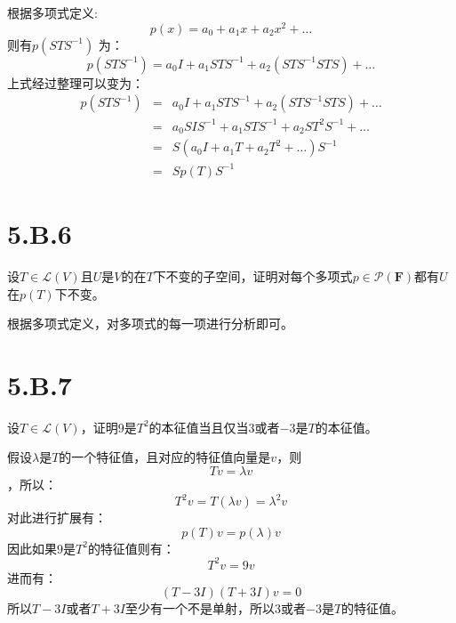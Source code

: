 \documentclass[10pt,a4paper,UTF8]{article}
\begin{document}
\begin{answer}
根据多项式定义:
\begin{equation}
\label{eq:3}
p(x) = a_{0} + a_{1}x + a_{2}x^{2} + \ldots
\end{equation}
则有\(p(STS^{-1})\) 为：
\begin{equation}
\label{eq:4}
p(STS^{-1}) = a_{0}I + a_{1}STS^{-1} + a_{2}(STS^{-1}STS) + \ldots
\end{equation}
上式经过整理可以变为：
\begin{eqnarray}
\label{eq:5}
p(STS^{-1}) &=& a_{0}I + a_{1}STS^{-1} + a_{2}(STS^{-1}STS) + \ldots \\
&=& a_{0}SIS^{-1} + a_{1}STS^{-1} + a_{2}ST^{2}S^{-1} + \ldots \\
&=& S(a_{0}I + a_{1}T + a_{2}T^{2} + \ldots )S^{-1} \\
&=&Sp(T)S^{-1}
\end{eqnarray}
\end{answer}

\section{5.B.6}
\label{sec:org1243dcd}


\begin{problem}
设\(T\in \mathcal{L}(V)\)且\(U\)是\(V\)的在\(T\)下不变的子空间，证明对每个多项式\(p\in \mathcal{P}(\mathbf{F})\)都有\(U\)在\(p(T)\)下不变。
\end{problem}

\begin{answer}
根据多项式定义，对多项式的每一项进行分析即可。
\end{answer}

\section{5.B.7}
\label{sec:org71ffdbd}


\begin{problem}
设\(T\in \mathcal{L}(V)\)，证明\(9\)是\(T^{2}\)的本征值当且仅当\(3\)或者\(-3\)是\(T\)的本征值。
\end{problem}

\begin{answer}
假设\(\lambda\)是\(T\)的一个特征值，且对应的特征值向量是\(v\)，则\[Tv = \lambda v\]，所以：\[T^{2}v = T(\lambda v) = \lambda^{2}v\] 对此进行扩展有：\[p(T)v = p(\lambda)v\]
因此如果\(9\)是\(T^{2}\)的特征值则有：\[T^{2}v = 9v \]进而有：\[(T-3I)(T+3I)v = 0\]所以\(T-3I\)或者\(T+3I\)至少有一个不是单射，所以\(3\)或者\(-3\)是\(T\)的特征值。
\end{answer}
\end{document}
